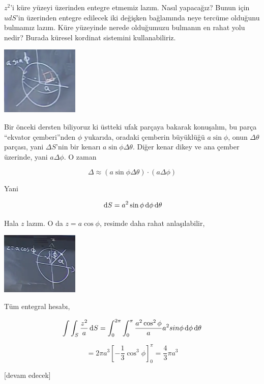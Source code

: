 \documentclass[12pt,fleqn]{article}\usepackage{../../common}
\begin{document}
$z^2$'i küre yüzeyi üzerinden entegre etmemiz lazım. Nasıl yapacağız?  Bunun
için $ud S$'in üzerinden entegre edilecek iki değişken bağlamında neye tercüme
olduğunu bulmamız lazım. Küre yüzeyinde nerede olduğumuzu bulmanın en rahat yolu
nedir? Burada küresel kordinat sistemini kullanabiliriz.

\includegraphics[width=10em]{calc_multi_27_05.png}

Bir önceki dersten biliyoruz ki üstteki ufak parçaya bakarak konuşalım, bu parça
``ekvator çemberi''nden $\phi$ yukarıda, oradaki çemberin büyüklüğü
$a\sin\phi$, onun $\Delta \theta$ parçası, yani $\Delta S$'nin bir kenarı
$a\sin\phi \Delta \theta$. Diğer kenar dikey ve ana çember üzerinde, yani
$a \Delta \phi$. O zaman

$$
\Delta  \approx (a\sin\phi \Delta \theta) \cdot (a \Delta \phi)
$$

Yani

$$
\,\mathrm{d} S = a^2 \sin\phi \,\mathrm{d} \phi \,\mathrm{d} \theta
$$

Hala $z$ lazım. O da $z = a \cos\phi$, resimde daha rahat anlaşılabilir,

\includegraphics[width=10em]{calc_multi_27_06.png}

Tüm entegral hesabı,

$$
\int \int_S \frac{z^2}{a} \,\mathrm{d} S =
\int_{0}^{2\pi} \int_{0}^{\pi} \frac{a^2 \cos^2 \phi}{a} a^2 sin\phi
\,\mathrm{d} \phi \,\mathrm{d} \theta
$$

$$
= 2\pi a^3 \left[ -\frac{1}{3} \cos^3 \phi  \right]_{0}^{\pi} =
\frac{4}{3} \pi a^3
$$









[devam edecek]
\end{document}
